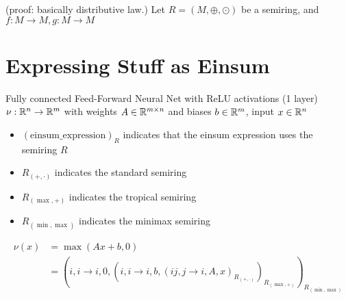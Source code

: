 (proof: basically distributive law.)
Let $R = (M, \oplus, \odot)$ be a semiring, and $f: M \rightarrow M, g: M \rightarrow M$

\section{Expressing Stuff as Einsum}

Fully connected Feed-Forward Neural Net with ReLU activations (1 layer) $\nu: \mathbb{R}^n \rightarrow \mathbb{R}^m$ with weights $A \in \mathbb{R}^{m \times n}$ and biases $b \in \mathbb{R}^m$, input $x \in \mathbb{R}^n$
\begin{itemize}[noitemsep]
    \item $(\text{einsum\_expression})_{R}$ indicates that the einsum expression uses the semiring $R$
    \item $R_{(+, \cdot)}$ indicates the standard semiring
    \item $R_{(\max, +)}$ indicates the tropical semiring
    \item $R_{(\min, \max)}$ indicates the minimax semiring
\end{itemize}
\begin{align*}
    \nu(x) & = \max(Ax + b, 0)                                                                                                                  \\
           & = (i,i\rightarrow i, 0, (i,i \rightarrow i, b, (ij, j \rightarrow i, A, x)_{R_{(+, \cdot)}} )_{R_{(\max, +)}} )_{R_{(\min, \max)}}
\end{align*}

